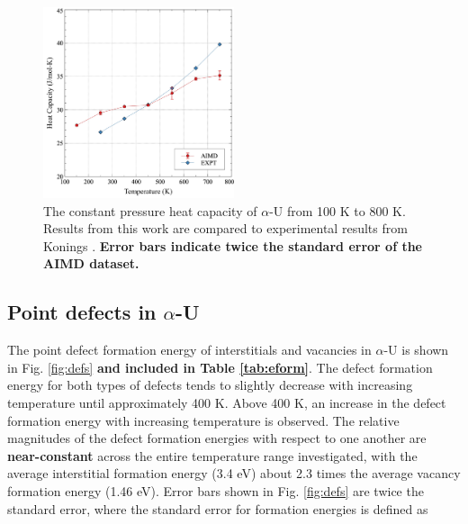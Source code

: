 \documentclass[utf8]{frontiersSCNS} %
\providecommand{\DIFaddtex}[1]{{\bf #1}} %
\providecommand{\DIFdeltex}[1]{} %
\providecommand{\DIFaddbegin}{\protect\color{blue}} %
\providecommand{\DIFaddend}{\protect\color{black}} %
\providecommand{\DIFdelbegin}{\protect\color{red}} %
\providecommand{\DIFdelend}{\protect\color{black}} %
\providecommand{\DIFaddFL}[1]{\DIFadd{#1}} %
\providecommand{\DIFaddbeginFL}{} %
\providecommand{\DIFaddendFL}{} %
\providecommand{\DIFdelbeginFL}{} %
\providecommand{\DIFdelendFL}{} %
\providecommand{\DIFadd}[1]{\texorpdfstring{\DIFaddtex{#1}}{#1}} %
\providecommand{\DIFdel}[1]{\texorpdfstring{\DIFdeltex{#1}}{}} %
\begin{document}
 \begin{figure}[hbt]
	\centering
	\DIFdelbeginFL %
\DIFdelendFL \DIFaddbeginFL \includegraphics[width=0.5\textwidth]{cp.jpg}
  \DIFaddendFL \caption{The constant pressure heat capacity of $\alpha$-U from 100 K to 800 K. Results from this work are compared to experimental results from Konings \cite{konings2010}. \DIFaddbeginFL \DIFaddFL{Error bars indicate twice the standard error of the AIMD dataset.}\DIFaddendFL }\label{fig:cp}
\end{figure}

\FloatBarrier

\subsection{Point defects in $\alpha$-U}

The point defect formation energy of interstitials and vacancies in $\alpha$-U is shown in Fig. \ref{fig:defs} \DIFaddbegin \DIFadd{and included in Table \ref{tab:eform}}\DIFaddend . The defect formation energy for both types of defects tends to slightly decrease with increasing temperature until approximately 400 K. Above 400 K, an increase in the defect formation energy with increasing temperature is observed. The relative magnitudes of the defect formation energies with respect to one another are \DIFdelbegin \DIFdel{near constant }\DIFdelend \DIFaddbegin \DIFadd{near-constant }\DIFaddend across the entire temperature range investigated, with the average interstitial formation energy (3.4 eV) about 2.3 times the average vacancy formation energy (1.46 eV). Error bars shown in Fig. \ref{fig:defs} are twice the standard error, where the standard error for formation energies is defined as 
\end{document}
